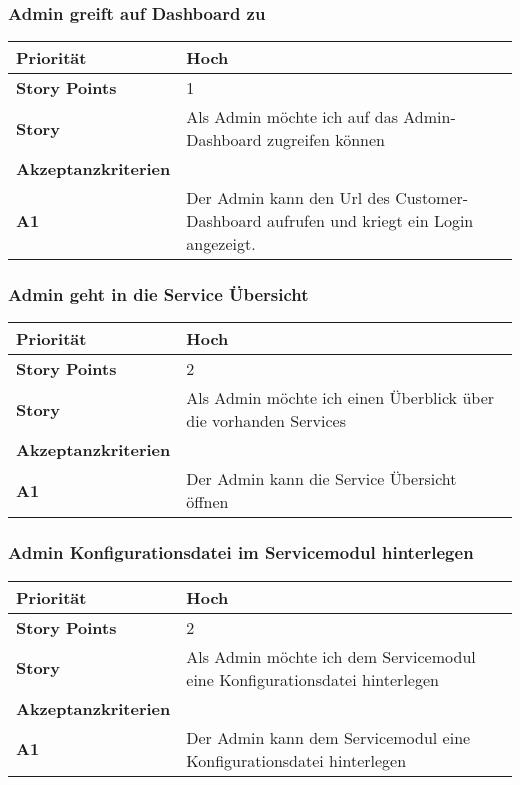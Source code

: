  \subsubsection{Admin greift auf Dashboard zu}
\begin{tabularx}{\linewidth}{l X}
  \textbf{Priorität} & Hoch\\
  \hline
  \textbf{Story Points} & 1\\
  \hline
  \textbf{Story}& Als Admin möchte ich auf das Admin-Dashboard zugreifen können\\
  \hline
    \textbf{Akzeptanzkriterien} & \\
    \hline
  \textbf{A1} & Der Admin kann den Url des Customer-Dashboard aufrufen und 
  kriegt ein Login angezeigt.\\
  \hline
 \end{tabularx}
 
 \subsubsection{Admin geht in die Service Übersicht}
 
    \begin{tabularx}{\linewidth}{l X}
  \textbf{Priorität} & Hoch\\
  \hline
  \textbf{Story Points} & 2\\
  \hline
  \textbf{Story}& Als Admin möchte ich einen Überblick über die vorhanden Services\\
  \hline
    \textbf{Akzeptanzkriterien} & \\
    \hline
      \textbf{A1} & Der Admin kann die Service Übersicht öffnen\\
  \hline
 \end{tabularx}


 \subsubsection{Admin Konfigurationsdatei im Servicemodul hinterlegen}
     \begin{tabularx}{\linewidth}{l X}
  \textbf{Priorität} & Hoch\\
  \hline
  \textbf{Story Points} & 2\\
  \hline
  \textbf{Story}& Als Admin möchte ich dem Servicemodul eine Konfigurationsdatei hinterlegen\\
  \hline
    \textbf{Akzeptanzkriterien} & \\
    \hline
      \textbf{A1} & Der Admin kann dem Servicemodul eine Konfigurationsdatei hinterlegen\\
  \hline
 \end{tabularx}
 

